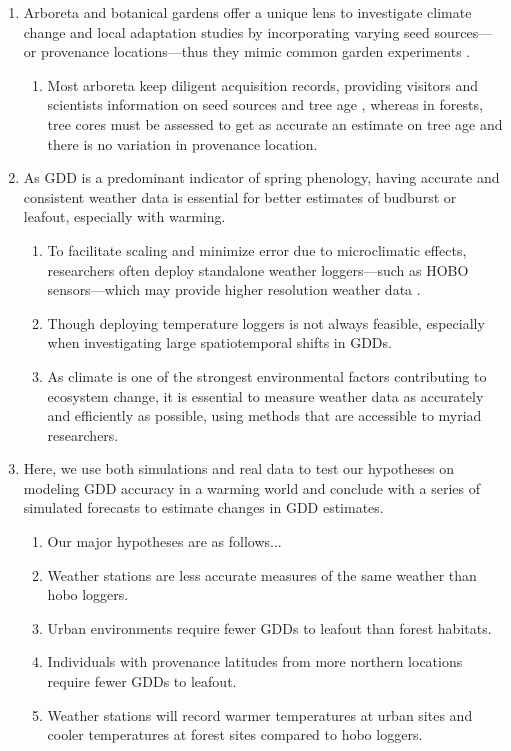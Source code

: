 \documentclass{article}\usepackage[]{graphicx}\usepackage[]{color}
\begin{document}
\begin{enumerate}
\item Arboreta and botanical gardens offer a unique lens to investigate climate change and local adaptation studies by incorporating varying seed sources---or provenance locations---thus they mimic common garden experiments \citep{Primack2009}. 
  \begin{enumerate}
  \item Most arboreta keep diligent acquisition records, providing visitors and scientists information on seed sources and tree age \citep{Dosmann2006}, whereas in forests, tree cores must be assessed to get as accurate an estimate on tree age and there is no variation in provenance location.
  \end{enumerate}
  
\item As GDD is a predominant indicator of spring phenology, having accurate and consistent weather data is essential for better estimates of budburst or leafout, especially with warming.
  \begin{enumerate}
  \item To facilitate scaling and minimize error due to microclimatic effects, researchers often deploy standalone weather loggers---such as HOBO sensors---which may provide higher resolution weather data \citep{Schwartz2013a,Whiteman2000}.
  \item Though deploying temperature loggers is not always feasible, especially when investigating large spatiotemporal shifts in GDDs. 
  \item As climate is one of the strongest environmental factors contributing to ecosystem change, it is essential to measure weather data as accurately and efficiently as possible, using methods that are accessible to myriad researchers.
  \end{enumerate}
  
\item Here, we use both simulations and real data to test our hypotheses on modeling GDD accuracy in a warming world and conclude with a series of simulated forecasts to estimate changes in GDD estimates.
  \begin{enumerate}
  \item Our major hypotheses are as follows...
  \item Weather stations are less accurate measures of the same weather than hobo loggers.
  \item Urban environments require fewer GDDs to leafout than forest habitats.
  \item Individuals with provenance latitudes from more northern locations require fewer GDDs to leafout. 
  \item Weather stations will record warmer temperatures at urban sites and cooler temperatures at forest sites compared to hobo loggers. 
  \end{enumerate}
\end{enumerate}
  
\end{document}
